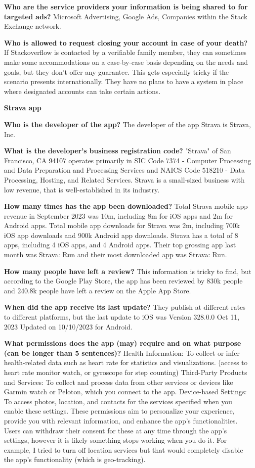 \textbf{Who are the service providers your information is being shared to for targeted ads?}
Microsoft Advertising, Google Ads, Companies within the Stack Exchange network.

\textbf{Who is allowed to request closing your account in case of your death?}
If Stackoverflow is contacted by a verifiable family member,
they can sometimes make some accommodations on a case-by-case basis depending
on the needs and goals, but they don't offer any guarantee.
This gets especially tricky if the scenario presents internationally.
They have no plans to have a system in place where designated accounts can take certain actions.

\textbf{Strava app}

\textbf{Who is the developer of the app?} The developer of the app Strava is Strava, Inc.

\textbf{What is the developer's business registration code?}
"Strava" of San Francisco, CA 94107 operates primarily in SIC Code 7374 - Computer Processing and Data Preparation and Processing Services and NAICS Code 518210 - Data Processing, Hosting, and Related Services.
Strava is a small-sized business with low revenue, that is well-established in its industry.

\textbf{How many times has the app been downloaded?}
Total Strava mobile app revenue in September 2023 was 10m, including 8m for iOS apps and 2m for Android apps.
Total mobile app downloads for Strava was 2m, including 700k iOS app downloads and 900k Android app downloads.
Strava has a total of 8 apps, including 4 iOS apps, and 4 Android apps.
Their top grossing app last month was Strava: Run and their most downloaded app was Strava: Run.

\textbf{How many people have left a review?}
This information is tricky to find, but according to the Google Play Store, the app has been reviewed by 830k people and 240.8k people have left a review on the Apple App Store.

\textbf{When did the app receive its last update?}
They publish at different rates to different platforms, but the last update to iOS was Version 328.0.0 Oct 11, 2023 Updated on
10/10/2023 for Android.

\textbf{What permissions does the app (may) require and on what purpose (can be longer than 5 sentences)?}
Health Information: To collect or infer health-related data such as heart rate for statistics and visualizations. (access to heart rate
monitor watch, or gyroscope for step counting)
Third-Party Products and Services: To collect and process data from other services or devices like Garmin watch or Peloton, which you connect to the app.
Device-based Settings: To access photos, location, and contacts for the services specified when you enable these settings.
These permissions aim to personalize your experience, provide you with relevant information, and enhance the app's functionalities.
Users can withdraw their consent for these at any time through the app's settings, however it is likely something stops working when you
do it.
For example, I tried to turn off location services but that would completely disable the app's functionality (which is geo-tracking).

